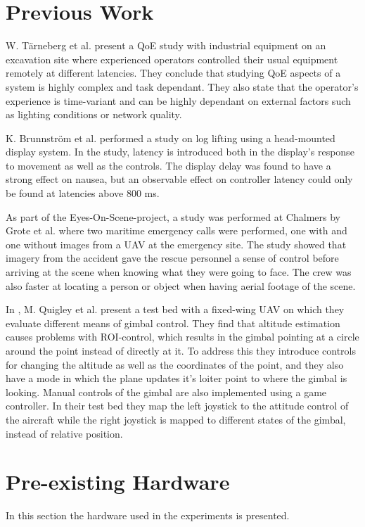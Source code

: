 \documentclass[nofilelist]{cslthse-msc}
\begin{document}
\section{Previous Work}

W. Tärneberg et al. \cite{industry4.0} present a QoE study with industrial equipment on an excavation site where experienced operators controlled their usual equipment remotely at different latencies. They conclude that studying QoE aspects of a system is highly complex and task dependant. They also state that the operator's experience is time-variant and can be highly dependant on external factors such as lighting conditions or network quality.

K. Brunnström et al. \cite{latency-impact} performed a study on log lifting using a head-mounted display system. In the study, latency is introduced both in the display's response to movement as well as the controls. The display delay was found to have a strong effect on nausea, but an observable effect on controller latency could only be found at latencies above 800 ms. 

As part of the Eyes-On-Scene-project, a study was performed at Chalmers by Grote et al. \cite{eos-maritime} where two maritime emergency calls were performed, one with and one without images from a UAV at the emergency site. The study showed that imagery from the accident gave the rescue personnel a sense of control before arriving at the scene when knowing what they were going to face. The crew was also faster at locating a person or object when having aerial footage of the scene.

In \cite{targetting}, M. Quigley et al. present a test bed with a fixed-wing UAV on which they evaluate different means of gimbal control. They find that altitude estimation causes problems with ROI-control, which results in the gimbal pointing at a circle around the point instead of directly at it. To address this they introduce controls for changing the altitude as well as the coordinates of the point, and they also have a mode in which the plane updates it's loiter point to where the gimbal is looking. Manual controls of the gimbal are also implemented using a game controller. In their test bed they map the left joystick to the attitude control of the aircraft while the right joystick is mapped to different states of the gimbal, instead of relative position.

\section{Pre-existing Hardware}
In this section the hardware used in the experiments is presented.
\end{document}
